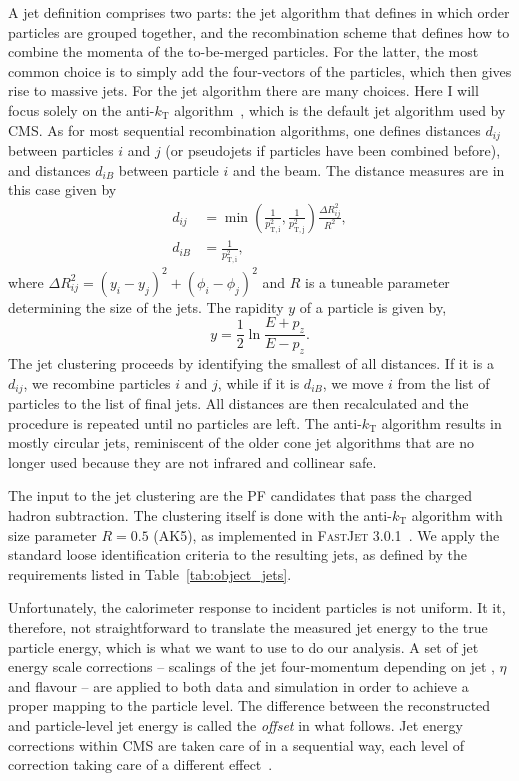 A jet definition comprises two parts: the jet algorithm that defines in which order particles are
grouped together, and the recombination scheme that defines how to combine the momenta of the
to-be-merged particles. 
For the latter, the most common choice is to simply add the four-vectors of the particles, which
then gives rise to massive jets. 
For the jet algorithm there are many choices. Here I will focus solely on the anti-$k_\textrm{T}$
algorithm~\cite{antikt}, which is the default jet algorithm used by CMS.
As for most sequential recombination algorithms, one defines distances $d_{ij}$ between particles
$i$ and $j$ (or pseudojets if particles have been combined before),  and distances $d_{iB}$ between
particle $i$ and the beam.
The distance measures are in this case given by
\begin{align}
  d_{ij} &= \min \left(\frac{1}{p_{\mathrm{T,i}}^2}, \frac{1}{p_{\mathrm{T,j}}^2}\right)
\frac{\Delta R_{ij}^2}{R^2}, \\
  d_{iB} &= \frac{1}{p_{\mathrm{T,i}}^2},
\end{align}
where $\Delta R_{ij}^2 = (y_i - y_j)^2 + (\phi_i - \phi_j)^2$ and $R$ is a tuneable parameter
determining the size of the jets. The rapidity $y$ of a particle is given by,
\begin{equation}
  y = \frac{1}{2} \ln{\frac{ E + p_z }{ E - p_z }} .
\end{equation}
The jet clustering proceeds by identifying the smallest of all distances. If it is a $d_{ij}$, we
recombine particles $i$ and $j$, while if it is $d_{iB}$, we move $i$ from the list of particles to
the list of final jets. All distances are then recalculated and the procedure is repeated until no
particles are left.
The anti-$k_\textrm{T}$ algorithm results in mostly circular jets, reminiscent of the older cone jet
algorithms that are no longer used because they are not infrared and collinear safe.

The input to the jet clustering are the PF candidates that pass the charged hadron subtraction. 
The clustering itself is done with the anti-$k_\textrm{T}$ algorithm with size parameter $R=0.5$
(AK5), as implemented in \textsc{FastJet 3.0.1}~\cite{Cacciari:2011ma}.
We apply the standard loose identification criteria to the resulting jets, as defined by the
requirements listed in Table~\ref{tab:object_jets}. 

Unfortunately, the calorimeter response to incident particles is not uniform. It it, therefore, not
straightforward to translate the measured jet energy to the true particle energy, which is what we
want to use to do our analysis. A set of jet energy scale corrections -- scalings of the
jet four-momentum depending on jet \pt, $\eta$ and flavour -- are applied to both data and
simulation in order to achieve a proper mapping to the particle level. The difference between the
reconstructed and particle-level jet energy is called the \textit{offset} in what follows.
Jet energy corrections within CMS are taken care of in a sequential way, each level of correction
taking care of a different effect~\cite{JEC}. 

